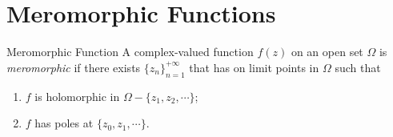 \section{Meromorphic Functions}

\begin{definition}{Meromorphic Function}{}
  A complex-valued function $f(z)$ on an open set $\Omega$ is \emph{meromorphic} if there exists
  $\{z_n\}_{n=1}^{+\infty}$ that has on limit points in $\Omega$ such that
  \begin{enumerate}
  \item $f$ is holomorphic in $\Omega - \{z_1,z_2,\cdots\}$;
  \item $f$ has poles at $\{z_0,z_1,\cdots\}$.
  \end{enumerate}
\end{definition}


